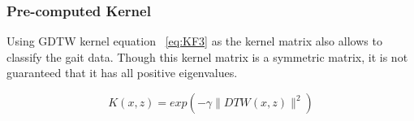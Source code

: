 \documentclass{sig-alternate}
\begin{document}
\subsubsection{Pre-computed Kernel}
Using GDTW kernel equation ~\ref{eq:KF3} as the kernel matrix also allows to classify the gait data. Though this kernel matrix is a symmetric matrix, it is not guaranteed that it has all positive eigenvalues. 

\begin{equation} \label{eq:KF3}
K(x,z)=exp(-\gamma \parallel DTW(x,z) \parallel ^2)
\end{equation}

\end{document}
